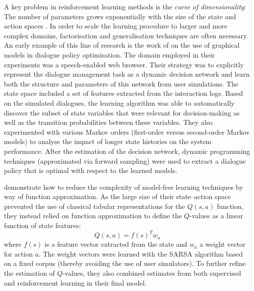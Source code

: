 A key problem in reinforcement learning methods is the \textit{curse of dimensionality}: The number of parameters grows exponentially with the size of the state and action spaces \citep{citeulike:112017}.  In order to scale the learning procedure to larger and more complex domains, factorisation and generalisation techniques are often necessary.  An early example of this line of research is the work of \cite{PaekC06} on the use of graphical models in dialogue policy optimisation. The domain employed in their experiments was a speech-enabled web browser.  Their strategy was to explicitly represent the dialogue management task as a dynamic decision network and learn both the structure and parameters of this network from user simulations.  The state space included a set of features extracted from the interaction logs. Based on the simulated dialogues, the learning algorithm was able to automatically discover the subset of state variables that were relevant for decision-making as well as the transition probabilities between these variables.   They also experimented with various Markov orders (first-order versus second-order Markov models) to analyse the impact of longer state histories on the system performance.  After the estimation of the decision network, dynamic programming techniques (approximated via forward sampling) were used to extract a dialogue policy that is optimal with respect to the learned models. %

\cite{Henderson:2008} demonstrate how to reduce the complexity of model-free learning techniques by way of function approximation.  As the large size of their state--action space prevented the use of classical tabular representations for the $Q(s,a)$ function, they instead relied on function approximation to define the $Q$-values as a linear function of state features:
\begin{equation}
Q(s,a) = f(s)^{T} w_a 
\end{equation}
where $f(s)$ is a feature vector extracted from the state and $w_a$ a weight vector for action $a$. The weight vectors were learned with the SARSA algorithm based on a fixed corpus (thereby avoiding the use of user simulators). To further refine the estimation of $Q$-values, they also combined estimates from both supervised and reinforcement learning in their final model. 

